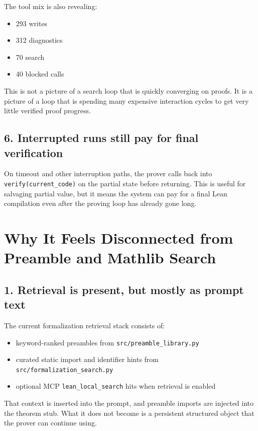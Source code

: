 \documentclass[11pt]{article}
\begin{document}
The tool mix is also revealing:

\begin{itemize}[leftmargin=1.5em]
  \item 293 writes
  \item 312 diagnostics
  \item 70 search
  \item 40 blocked calls
\end{itemize}

This is not a picture of a search loop that is quickly converging on proofs. It
is a picture of a loop that is spending many expensive interaction cycles to get
very little verified proof progress.

\subsection*{6. Interrupted runs still pay for final verification}

On timeout and other interruption paths, the prover calls back into
\texttt{verify(current\_code)} on the partial state before returning. This is
useful for salvaging partial value, but it means the system can pay for a final
Lean compilation even after the proving loop has already gone long.

\section{Why It Feels Disconnected from Preamble and Mathlib Search}

\subsection*{1. Retrieval is present, but mostly as prompt text}

The current formalization retrieval stack consists of:

\begin{itemize}[leftmargin=1.5em]
  \item keyword-ranked preambles from \texttt{src/preamble\_library.py}
  \item curated static import and identifier hints from \texttt{src/formalization\_search.py}
  \item optional MCP \texttt{lean\_local\_search} hits when retrieval is enabled
\end{itemize}

That context is inserted into the prompt, and preamble imports are injected into
the theorem stub. What it does not become is a persistent structured object that
the prover can continue using.
\end{document}
